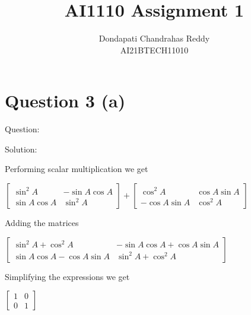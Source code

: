 \documentclass{article}
\begin{document}
\title{AI1110 Assignment 1
}
\author{
Dondapati Chandrahas Reddy
\\
AI21BTECH11010
}
\maketitle





\section{Question 3 (a)
}
{\Large Question:}



\begin{center}
\setlength\fboxrule{0in}\setlength\fboxsep{0.1in}
\end{center}
{\Large Solution:
\newline }


Performing scalar multiplication we get



\begin{center}$\left [\begin{array}{cc}\sin ^{2}A &  -\sin A\cos A \\
\sin A\cos A & \sin ^{2}A\end{array}\right ] +\left [\begin{array}{cc}\cos ^{2}A & \cos A\sin A \\
 -\cos A\sin A & \cos ^{2}A\end{array}\right ]$\newline \end{center}\par
Adding the matrices



\begin{center}$\left [\begin{array}{cc}\sin ^{2}A +\cos ^{2}A &  -\sin A\cos A +\cos A\sin A \\
\sin A\cos A -\cos A\sin A & \sin ^{2}A +\cos ^{2}A\end{array}\right ]$\linebreak\relax \end{center}\par
Simplifying the expressions we get



\begin{center}$\left [\begin{array}{cc}1 & 0 \\
0 & 1\end{array}\right ]$\end{center}\par
\end{document}
